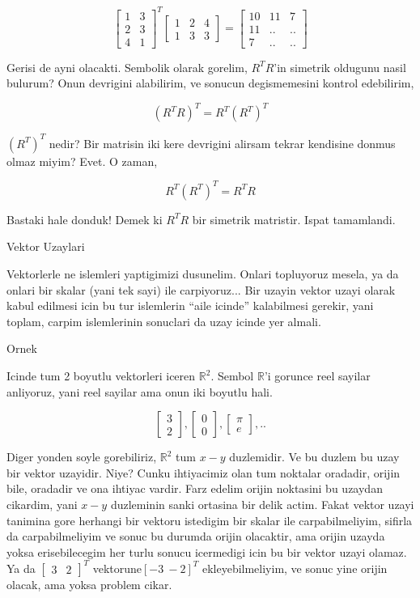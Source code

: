 \documentclass[12pt,fleqn]{article}\usepackage{../common}
\begin{document}
$$ 
\left[\begin{array}{rr}
1 & 3 \\
2 & 3 \\
4 & 1 
\end{array}\right]^T
\left[\begin{array}{rrr}
1 & 2 & 4 \\
1 & 3 & 3 
\end{array}\right]
=
\left[\begin{array}{rrr}
10 & 11 & 7 \\
11 & .. & .. \\
7 & .. & ..
\end{array}\right]
 $$  

Gerisi de ayni olacakti. Sembolik olarak gorelim, $R^TR$'in simetrik
oldugunu nasil bulurum? Onun devrigini alabilirim, ve sonucun degismemesini
kontrol edebilirim,

$$ (R^TR)^T = R^T(R^T)^T $$

$(R^T)^T$ nedir? Bir matrisin iki kere devrigini alirsam tekrar kendisine
donmus olmaz miyim? Evet. O zaman, 

$$  R^T(R^T)^T = R^T R $$

Bastaki hale donduk! Demek ki $R^TR$ bir simetrik matristir. Ispat
tamamlandi. 

Vektor Uzaylari

Vektorlerle ne islemleri yaptigimizi dusunelim. Onlari topluyoruz mesela,
ya da onlari bir skalar (yani tek sayi) ile carpiyoruz... Bir uzayin vektor
uzayi olarak kabul edilmesi icin bu tur islemlerin ``aile icinde''
kalabilmesi gerekir, yani toplam, carpim islemlerinin sonuclari da uzay
icinde yer almali. 

Ornek

Icinde tum 2 boyutlu vektorleri iceren $ \mathbb{R}^2 $. Sembol
$\mathbb{R}$'i gorunce reel sayilar anliyoruz, yani reel sayilar ama onun
iki boyutlu hali.

$$ 
\left[\begin{array}{r}
3 \\ 2 
\end{array}\right], 
\left[\begin{array}{r}
0 \\ 0
\end{array}\right], 
\left[\begin{array}{r}
\pi \\ e
\end{array}\right], 
..
 $$

Diger yonden soyle gorebiliriz, $\mathbb{R}^2$ tum $x-y$ duzlemidir. Ve bu
duzlem bu uzay bir vektor uzayidir. Niye? Cunku ihtiyacimiz olan tum
noktalar oradadir, orijin bile, oradadir ve ona ihtiyac vardir. Farz
edelim orijin noktasini bu uzaydan cikardim, yani $x-y$ duzleminin sanki
ortasina bir delik actim. Fakat vektor uzayi tanimina gore herhangi bir
vektoru istedigim bir skalar ile carpabilmeliyim, sifirla da
carpabilmeliyim ve sonuc bu durumda orijin olacaktir, ama orijin uzayda
yoksa erisebilecegim her turlu sonucu icermedigi icin bu bir vektor uzayi
olamaz. Ya da $\left[\begin{array}{rr}3 & 2\end{array}\right]^T$ vektorune$[-3 \ -2]^T$ ekleyebilmeliyim, ve sonuc yine 
orijin olacak, ama  yoksa problem cikar.
\end{document}
